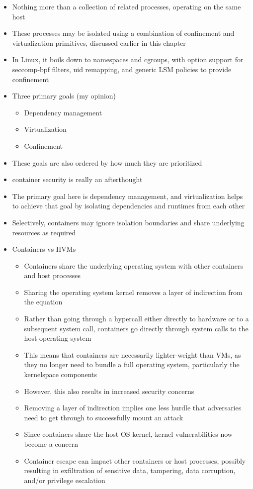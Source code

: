 \begin{inprogress}
\begin{itemize}
  \item Nothing more than a collection of related processes, operating on the same host
  \item These processes may be isolated using a combination of confinement and
  virtualization primitives, discussed earlier in this chapter
  \item In Linux, it boils down to namespaces and cgroups, with option support for
  seccomp-bpf filters, uid remapping, and generic LSM policies to provide confinement
  \item Three primary goals (my opinion)
  \begin{itemize}
    \item Dependency management
    \item Virtualization
    \item Confinement
  \end{itemize}
  \item These goals are also ordered by how much they are prioritized
  \item container security is really an afterthought
  \item The primary goal here is dependency management, and virtualization helps to
  achieve that goal by isolating dependencies and runtimes from each other
  \item Selectively, containers may ignore isolation boundaries and share underlying resources as required
  \item Containers vs HVMs
  \begin{itemize}
    \item Containers share the underlying operating system with other containers and host processes
    \item Sharing the operating system kernel removes a layer of indirection from the equation
    \item Rather than going through a hypercall either directly to hardware or to a subsequent system call,
    containers go directly through system calls to the host operating system
    \item This means that containers are necessarily lighter-weight than VMs, as they no
    longer need to bundle a full operating system, particularly the kernelspace components
    \item However, this also results in increased security concerns
    \item Removing a layer of indirection implies one less hurdle that adversaries need to get through to successfully mount an attack
    \item Since containers share the host OS kernel, kernel vulnerabilities now become a concern
    \item Container escape can impact other containers or host processes, possibly resulting in
    exfiltration of sensitive data, tampering, data corruption, and/or privilege escalation
  \end{itemize}
\end{itemize}
\end{inprogress}

